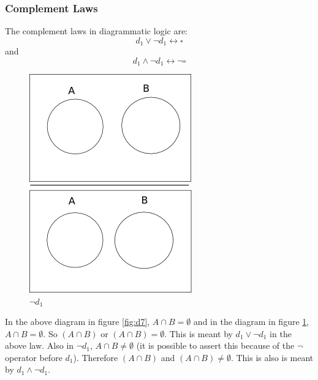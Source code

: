 \documentclass[10pt, a4paper, titlepage]{article}
\begin{document}
\subsubsection{Complement Laws} 
The complement laws in diagrammatic logic are:
$$ d_{1} \vee \neg d_{1} \longleftrightarrow \square $$
and
$$ d_{1} \wedge \neg d_{1} \longleftrightarrow \neg  \square $$

\begin{figure}[h]
\begin{minipage}[h]{0.5\linewidth}
\centering
\includegraphics[scale=0.5]{images/d7-1.png}
\caption{$ d_{1} $}
\label{fig:d7}
\end{minipage}
\hspace{0.5cm}
\begin{minipage}[h]{0.5\linewidth}
\centering
\includegraphics[scale=0.5]{images/d7-2.png}
\caption{$ \neg d_{1} $}
\label{fig:d7-1}
\end{minipage}
\end{figure}

In the above diagram in figure \ref{fig:d7}, $ A \cap B = \emptyset $  and in the diagram in figure \ref{fig:d7-1}, $ A \cap B  = \emptyset $. So $ ( A \cap B ) $ or $ ( A \cap B )  = \emptyset $. This is meant by $ d_{1} \vee \neg d_{1} $ in the above law. Also in $\neg d_{1}$, $ A \cap B \neq \emptyset $ (it is possible to assert this because of the $ \neg $ operator before $ d _{1}$). Therefore $ ( A \cap B ) $ and $ ( A \cap B ) \neq \emptyset $. This is also is meant by $ d_{1} \wedge \neg d_{1} $.\\
\end{document}
